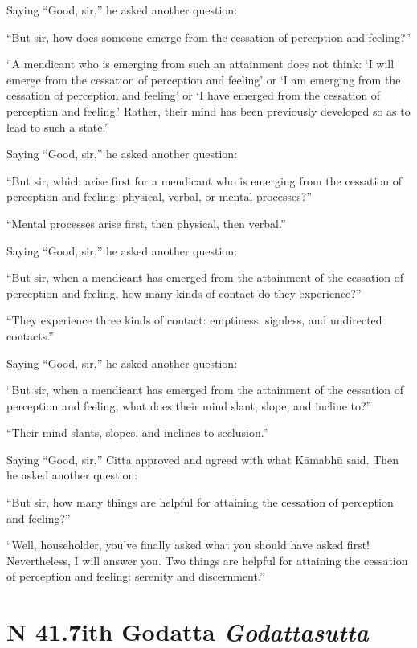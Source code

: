 \documentclass[12pt,openany]{book}%
\newcommand*{\suttatitleacronym}[1]{\smaller[2]{#1}\vspace*{.3em}}
\newcommand*{\suttatitletranslation}[1]{\linebreak{#1}}
\newcommand*{\suttatitleroot}[1]{\linebreak\smaller[2]\itshape{#1}}
\newcommand*{\tocacronym}[1]{\hspace*{-3.3em}{#1}\quad}
\newcommand*{\toctranslation}[1]{#1}
\newcommand*{\tocroot}[1]{(\textit{#1})}
\begin{document}
Saying “Good, sir,” he asked another question: 

“But sir, how does someone emerge from the cessation of perception and feeling?” 

“A mendicant who is emerging from such an attainment does not think: ‘I will emerge from the cessation of perception and feeling’ or ‘I am emerging from the cessation of perception and feeling’ or ‘I have emerged from the cessation of perception and feeling.’ Rather, their mind has been previously developed so as to lead to such a state.” 

Saying “Good, sir,” he asked another question: 

“But sir, which arise first for a mendicant who is emerging from the cessation of perception and feeling: physical, verbal, or mental processes?” 

“Mental processes arise first, then physical, then verbal.” 

Saying “Good, sir,” he asked another question: 

“But sir, when a mendicant has emerged from the attainment of the cessation of perception and feeling, how many kinds of contact do they experience?” 

“They experience three kinds of contact: emptiness, signless, and undirected contacts.” 

Saying “Good, sir,” he asked another question: 

“But sir, when a mendicant has emerged from the attainment of the cessation of perception and feeling, what does their mind slant, slope, and incline to?” 

“Their mind slants, slopes, and inclines to seclusion.” 

Saying “Good, sir,” Citta approved and agreed with what \textsanskrit{Kāmabhū} said. Then he asked another question: 

“But sir, how many things are helpful for attaining the cessation of perception and feeling?” 

“Well, householder, you’ve finally asked what you should have asked first! Nevertheless, I will answer you. Two things are helpful for attaining the cessation of perception and feeling: serenity and discernment.” 

%
\section*{{\suttatitleacronym SN 41.7}{\suttatitletranslation With Godatta }{\suttatitleroot Godattasutta}}
\addcontentsline{toc}{section}{\tocacronym{SN 41.7} \toctranslation{With Godatta } \tocroot{Godattasutta}}
\end{document}
